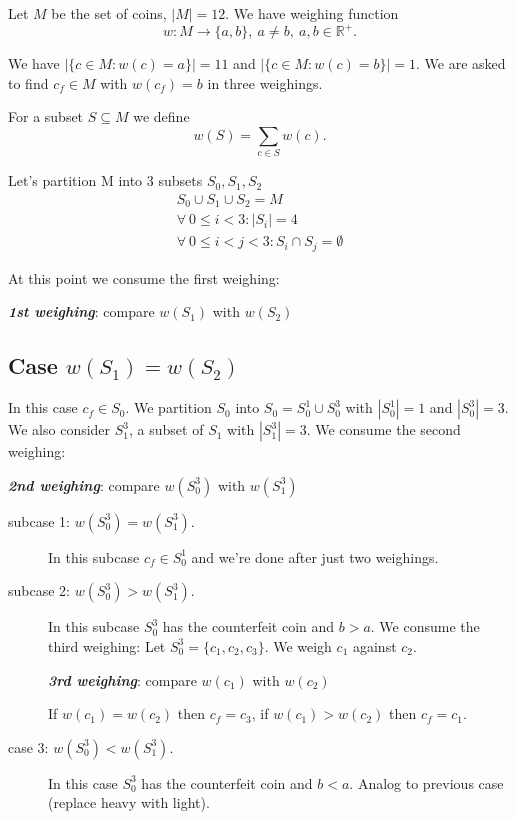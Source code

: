 Let $M$ be the set of coins, $|M|=12$. We have weighing function
\[
 	w : M \rightarrow \{a, b\},\  a \neq b,\ a, b \in \mathbb{R}^+.
\]

\noindent We have $| \{ c \in M : w(c) = a \} | = 11$ and  $| \{ c \in M : w(c) = b \} | = 1$. We are asked to find 
$c_f \in M$ with $w(c_f) = b$ in three weighings.\bigskip

\noindent For a subset $S \subseteq M$ we define
\[
	w(S) = \sum_{c \in S} w(c).
\]

\noindent Let's partition M into 3 subsets $S_0, S_1, S_2$
\[
	\begin{array}{l}
		S_0 \cup S_1 \cup S_2 = M \\
		\forall \ 0 \leq i < 3 : | S_i | = 4 \\
		\forall \ 0 \leq i <  j < 3 : S_i \cap S_j = \emptyset
	\end{array}	 	
\]

\noindent At this point we consume the first weighing:
\begin{center} \textbf{\textit{1st weighing}}: compare $w(S_1)$ with $w(S_2)$ \end{center}

\subsection{Case $w(S_1) = w(S_2)$}

In this case $c_f \in S_0$. We partition $S_0$ into $S_0 = S_0^1 \cup S_0^3$ with $| S_0^1 | = 1$ and 
$| S_0^3 | = 3$. We also consider $S_1^3$, a subset of $S_1$ with $| S_1^3 | = 3$. We consume the second weighing:
\begin{center} \textbf{\textit{2nd weighing}}: compare $w(S_0^3)$ with $w(S_1^3)$ \end{center}

\begin{description}
	\item [ subcase 1: $w(S_0^3) = w(S_1^3)$. ] In this subcase $c_f \in S_0^1$ and we're done after just two weighings.
	\item [ subcase 2: $w(S_0^3) > w(S_1^3)$. ] In this subcase $S_0^3$ has the counterfeit coin and $b > a$. We consume the third weighing: Let $S_0^3 = \{ c_1, c_2, c_3 \}$. We weigh $c_1$ against $c_2$.
\begin{center} \textbf{\textit{3rd weighing}}: compare $w(c_1)$ with $w(c_2)$ \end{center}
If $w(c_1) = w(c_2)$ then $c_f = c_3$, if $w(c_1) > w(c_2)$ then $c_f = c_1$.
	\item	[ case 3: $w(S_0^3) < w(S_1^3)$. ]  In this case $S_0^3$ has the counterfeit coin and $b < a$. Analog to previous case (replace heavy with light).
\end{description}

